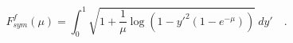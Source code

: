 \begin{equation}
F^f_{sym}(\mu) = \int_0^1 \sqrt{1+\frac{1}{\mu}\log\left(1-y'^2\left(1-e^{-\mu}\right)\right)}~dy'\quad.
\end{equation}

